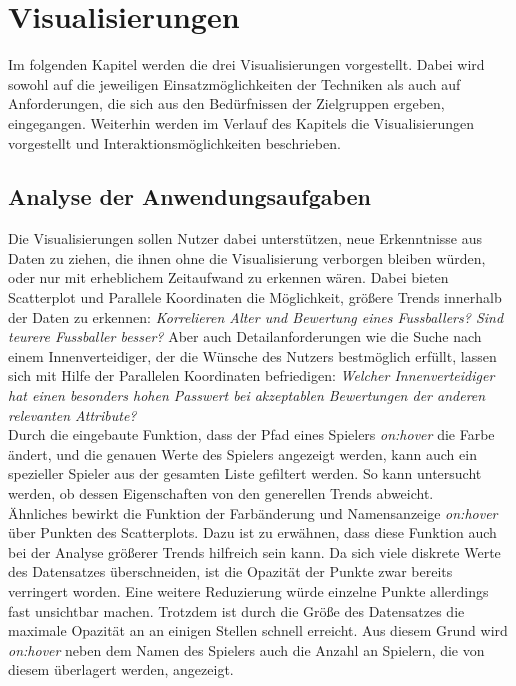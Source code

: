 \documentclass[usegeometry=true]{scrartcl}
\begin{document}
\section{Visualisierungen}
Im folgenden Kapitel werden die drei Visualisierungen vorgestellt. Dabei wird sowohl auf die jeweiligen Einsatzmöglichkeiten der Techniken als auch auf Anforderungen, die sich aus den Bedürfnissen der Zielgruppen ergeben, eingegangen. Weiterhin werden im Verlauf des Kapitels die Visualisierungen vorgestellt und Interaktionsmöglichkeiten beschrieben.  

\subsection{Analyse der Anwendungsaufgaben}
Die Visualisierungen sollen Nutzer dabei unterstützen, neue Erkenntnisse aus Daten zu ziehen, die ihnen ohne die Visualisierung verborgen bleiben würden, oder nur mit erheblichem Zeitaufwand zu erkennen wären.
Dabei bieten Scatterplot und Parallele Koordinaten die Möglichkeit, größere Trends innerhalb der Daten zu erkennen: \textit{Korrelieren Alter und Bewertung eines Fussballers? Sind teurere Fussballer besser?}
Aber auch Detailanforderungen wie die Suche nach einem Innenverteidiger, der die Wünsche des Nutzers bestmöglich erfüllt, lassen sich mit Hilfe der Parallelen Koordinaten befriedigen: \textit{Welcher Innenverteidiger hat einen besonders hohen Passwert bei akzeptablen Bewertungen der anderen relevanten Attribute?}\\
Durch die eingebaute Funktion, dass der Pfad eines Spielers \textit{on:hover} die Farbe ändert, und die genauen Werte des Spielers angezeigt werden, kann auch ein spezieller Spieler aus der gesamten Liste gefiltert werden. So kann untersucht werden, ob dessen Eigenschaften von den generellen Trends abweicht.\\
Ähnliches bewirkt die Funktion der Farbänderung und Namensanzeige \textit{on:hover} über Punkten des Scatterplots. Dazu ist zu erwähnen, dass diese Funktion auch bei der Analyse größerer Trends hilfreich sein kann. Da sich viele diskrete Werte des Datensatzes überschneiden, ist die Opazität der Punkte zwar bereits verringert worden. Eine weitere Reduzierung würde einzelne Punkte allerdings fast unsichtbar machen. Trotzdem ist durch die Größe des Datensatzes die maximale Opazität an an einigen Stellen schnell erreicht. Aus diesem Grund wird \textit{on:hover} neben dem Namen des Spielers auch die Anzahl an Spielern, die von diesem überlagert werden, angezeigt.\\
\end{document}
